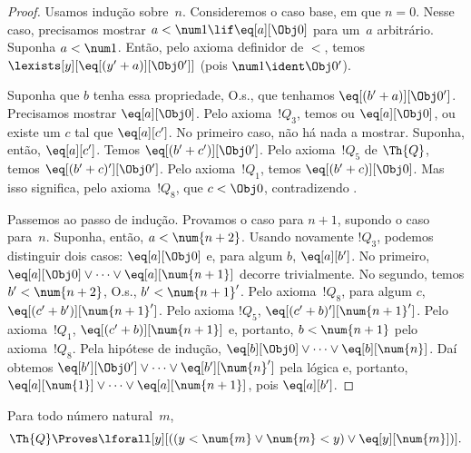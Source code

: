 \documentclass[../../../include/open-logic-section]{subfiles}
\begin{document}
\begin{proof}
Usamos indução sobre~$n$. Consideremos o caso base, em que $n = 0$.
Nesse caso, precisamos mostrar $a < \num 1 \lif \eq[a][\Obj 0]$ para
um~$a$ arbitrário. Suponha $a < \num 1$. Então, pelo axioma definidor
de $<$, temos $\lexists[y][\eq[(y'+a)][\Obj 0']]$ (pois
$\num 1 \ident \Obj 0'$).

Suponha que $b$ tenha essa propriedade, O.s.\@, que tenhamos
$\eq[(b'+a)][\Obj 0']$. Precisamos mostrar $\eq[a][\Obj 0]$. Pelo
axioma~$!Q_3$, temos ou $\eq[a][\Obj 0]$, ou existe um $c$ tal que
$\eq[a][c']$. No primeiro caso, não há nada a mostrar. Suponha, então,
$\eq[a][c']$. Temos $\eq[(b' + c')][\Obj 0']$. Pelo axioma~$!Q_5$ de
$\Th{Q}$, temos $\eq[(b'+c)'][\Obj 0']$. Pelo axioma~$!Q_1$, temos
$\eq[(b' + c)][\Obj 0]$. Mas isso significa, pelo axioma~$!Q_8$, que
$c < \Obj 0$, contradizendo .

Passemos ao passo de indução. Provamos o caso para $n+1$, supondo o
caso para~$n$. Suponha, então, $a < \num {n+2}$. Usando novamente
$!Q_3$, podemos distinguir dois casos: $\eq[a][\Obj 0]$ e, para algum
$b$, $\eq[a][b']$. No primeiro, $\eq[a][\Obj 0] \lor \dots \lor
\eq[a][\num{n+1}]$ decorre trivialmente. No segundo, temos
$b' < \num {n+2}$, O.s.\@, $b' < \num{n+1}'$. Pelo axioma~$!Q_8$,
para algum $c$, $\eq[(c'+b')][\num{n+1}']$. Pelo axioma $!Q_5$,
$\eq[(c'+b)'][\num{n+1}']$. Pelo axioma~$!Q_1$,
$\eq[(c'+b)][\num{n+1}]$ e, portanto, $b < \num{n+1}$ pelo
axioma~$!Q_8$. Pela hipótese de indução,
$\eq[b][\Obj 0] \lor \dots \lor \eq[b][\num{n}]$. Daí obtemos
$\eq[b'][\Obj 0'] \lor \dots \lor \eq[b'][\num{n}']$ pela lógica e,
portanto, $\eq[a][\num{1}] \lor \dots \lor \eq[a][\num{n+1}]$, pois
$\eq[a][b']$.
\end{proof}

\begin{lem}
   Para todo número natural~$m$,
  \[
  \Th{Q} \Proves
  \lforall[y][((y < \num{m} \lor \num{m} < y) \lor \eq[y][\num{m}])].
  \]
\end{lem}
\end{document}
